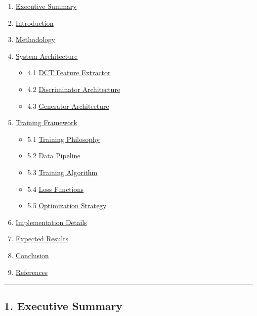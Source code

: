 \begin{enumerate}
\def\labelenumi{\arabic{enumi}.}
\tightlist
\item
  \hyperref[1-executive-summary]{Executive Summary}
\item
  \hyperref[2-introduction]{Introduction}
\item
  \hyperref[3-methodology]{Methodology}
\item
  \hyperref[4-system-architecture]{System Architecture}

  \begin{itemize}
  \tightlist
  \item
    4.1 \hyperref[41-dct-feature-extractor]{DCT Feature Extractor}
  \item
    4.2 \hyperref[42-discriminator-architecture]{Discriminator
    Architecture}
  \item
    4.3 \hyperref[43-generator-architecture]{Generator Architecture}
  \end{itemize}
\item
  \hyperref[5-training-framework]{Training Framework}

  \begin{itemize}
  \tightlist
  \item
    5.1 \hyperref[51-training-philosophy]{Training Philosophy}
  \item
    5.2 \hyperref[52-data-pipeline]{Data Pipeline}
  \item
    5.3 \hyperref[53-training-algorithm]{Training Algorithm}
  \item
    5.4 \hyperref[54-loss-functions]{Loss Functions}
  \item
    5.5 \hyperref[55-optimization-strategy]{Optimization Strategy}
  \end{itemize}
\item
  \hyperref[6-implementation-details]{Implementation Details}
\item
  \hyperref[7-expected-results]{Expected Results}
\item
  \hyperref[8-conclusion]{Conclusion}
\item
  \hyperref[9-references]{References}
\end{enumerate}

\begin{center}\rule{0.5\linewidth}{0.5pt}\end{center}

\subsection{1. Executive Summary}\label{executive-summary}

